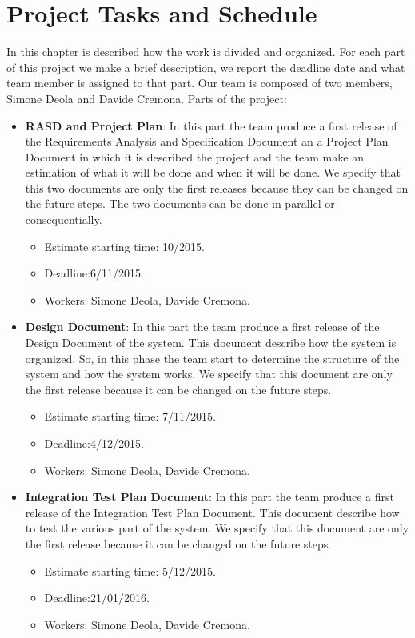 \documentclass[../../projectPlan.tex]{subfiles}
\begin{document}
	\chapter{Project Tasks and Schedule}	
	
		In this chapter is described how the work is divided and organized. For each part of this project we make a brief description, we report the deadline date and what team member is assigned to that part. Our team is composed of two members, Simone Deola and Davide Cremona.
		Parts of the project:
		\begin{itemize}
		\item \textbf{RASD and Project Plan}: In this part the team produce a first release of the Requirements Analysis and Specification Document an a Project Plan Document in which it is described the project and the team make an estimation of what it will be done and when it will be done. We specify that this two documents are only the first releases because they can be changed on the future steps. The two documents can be done in parallel or consequentially.
		\begin{itemize}
		\item Estimate starting time: 10/2015.
		\item Deadline:6/11/2015.
		\item Workers: Simone Deola, Davide Cremona.
		\end{itemize}
		
		
		\item \textbf{Design Document}: In this part the team produce a first release of the Design Document of the system. This document describe how the system is organized. So, in this phase the team start to determine the structure of the system and how the system works. We specify that this document are only the first release because it can be changed on the future steps.
		\begin{itemize}
		\item Estimate starting time: 7/11/2015.
		\item Deadline:4/12/2015.
		\item Workers: Simone Deola, Davide Cremona.
		\end{itemize}
		
		
		
		
		
		\item \textbf{Integration Test Plan Document}: In this part the team produce a first release of the Integration Test Plan Document. This document describe how to test the various part of the system. We specify that this document are only the first release because it can be changed on the future steps.
		\begin{itemize}
		\item Estimate starting time: 5/12/2015.
		\item Deadline:21/01/2016.
		\item Workers: Simone Deola, Davide Cremona.
		\end{itemize}		
		

\end{itemize}
\end{document}
